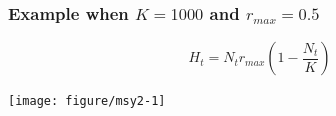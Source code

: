 \documentclass[color=usenames,dvipsnames]{beamer}\usepackage[]{graphicx}\usepackage[]{color}
\begin{document}
\begin{frame}[fragile]
  \frametitle{Example when $K=1000$ and $r_{max}=0.5$}
  \scriptsize
  \[
    H_t = N_t r_{max}\left(1 - \frac{N_t}{K} \right)
  \]
  \vspace{-1cm}

\begin{center}
  \texttt{[image: figure/msy2-1]}
\end{center}
\end{frame}






\end{document}
